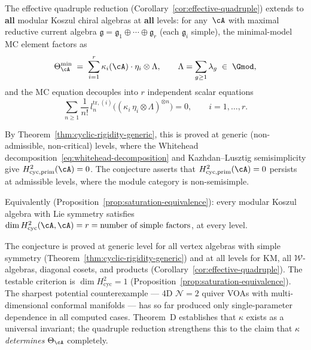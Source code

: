 \begin{conjecture}
\label{conj:scalar-saturation-universality}
\ClaimStatusConjectured
The effective quadruple reduction
\textup{(}Corollary~\textup{\ref{cor:effective-quadruple}}\textup{)}
extends to \textbf{all} modular Koszul chiral algebras at
\textbf{all} levels: for
any~$\cA$ with maximal reductive current algebra
$\mathfrak{g} = \mathfrak{g}_1 \oplus \cdots \oplus \mathfrak{g}_r$
\textup{(}each $\mathfrak{g}_i$ simple\textup{)}, the
minimal-model MC element factors as
\begin{equation}\label{eq:theta-multi-scalar}
\Theta^{\min}_{\cA}
\;=\; \sum_{i=1}^r \kappa_i(\cA) \cdot \eta_i \otimes \Lambda,
\qquad
\Lambda = \sum_{g \geq 1} \lambda_g \;\in\; \Gmod,
\end{equation}
and the MC equation decouples into $r$ independent scalar
equations
\begin{equation}\label{eq:mc-decoupled}
\sum_{n \geq 1} \frac{1}{n!}\,
l_n^{\mathrm{tr},(i)}
\bigl((\kappa_i \,\eta_i \otimes \Lambda)^{\otimes n}\bigr) = 0,
\qquad i = 1, \ldots, r.
\end{equation}

By Theorem~\textup{\ref{thm:cyclic-rigidity-generic}}, this
is proved at generic \textup{(}non-admissible,
non-critical\textup{)} levels, where the Whitehead
decomposition~\eqref{eq:whitehead-decomposition} and
Kazhdan--Lusztig semisimplicity give
$H^2_{\mathrm{cyc,prim}}(\cA) = 0$.
The conjecture asserts that
$H^2_{\mathrm{cyc,prim}}(\cA) = 0$ persists at admissible
levels, where the module category is non-semisimple.

Equivalently
\textup{(}Proposition~\textup{\ref{prop:saturation-equivalence}}\textup{)}:
every modular Koszul algebra with Lie symmetry satisfies
$\dim H^2_{\mathrm{cyc}}(\cA, \cA) = r =
\text{number of simple factors}$, at every level.
\end{conjecture}

\begin{remark}
\label{rem:scalar-saturation-evidence}
The conjecture is proved at generic level for all vertex algebras
with simple symmetry (Theorem~\ref{thm:cyclic-rigidity-generic})
and at all levels for KM, all $\mathcal{W}$-algebras, diagonal
cosets, and products (Corollary~\ref{cor:effective-quadruple}).
The testable criterion is $\dim H^2_{\mathrm{cyc}} = 1$
(Proposition~\ref{prop:saturation-equivalence}).
The sharpest potential counterexample --- 4D $\mathcal{N}=2$
quiver VOAs with multi-dimensional conformal manifolds ---
has so far produced only single-parameter dependence in all
computed cases.
Theorem~D establishes that $\kappa$ exists as a universal
invariant; the quadruple reduction strengthens this to the
claim that $\kappa$ \emph{determines} $\Theta_{\cA}$ completely.
\end{remark}

